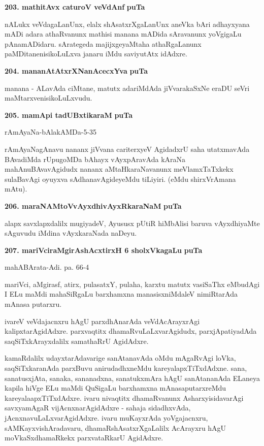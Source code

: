 \noindent
\textbf{203. mathitAvx caturoV veVdAnf} \hfill{\bf puTa \pageref{41}}

\smallskip
nALukx veVdagaLanUnx, elalx shAsatxrXgaLanUnx aneVka bAri adhayxyana mADi adara athaRvanunx mathisi\- manana mADida sAravanunx yoVgigaLu pAnamADidaru. sArategeda majijxgeyaMtaha athaR\-gaLanunx paMDi\-ta\-nenisikoLuLxva janaru iMdu saviyutAtx idAdxre.


\medskip
\noindent
\textbf{204. mananAtAtxrXNanAcecxYva} \hfill{\bf puTa \pageref{121}}

\smallskip
manana - ALavAda ciMtane, matutx adariMdAda jiVvarakaSxNe eraDU seVri maMtarxvenisikoLuLxvudu.

\medskip
\noindent
\textbf{205. mamApi tadUBxtikaraM} \hfill{\bf puTa \pageref{236}}

\hfill{rAmAyaNa-bAlakAMDa-5-35}

\smallskip
rAmAyaNagAnavu nananx jiVvana cariterxyeV AgidadxrU saha utatxmavAda BAvadiMda rUpu\-goMDa bAhayx vAyxpAravAda kAraNa mahAnuBAvavAgidudx nananx aMtaHkaraNavanunx meVlamxTaTxkekx sulaBavAgi oyuyx\-va sAdhanavAgideyeMdu tiLiyiri. (eMdu shirxVrAmana mAtu).

\medskip
\noindent
\textbf{206. maraNAMtoVvAyxdhivAyxRkaraNaM} \hfill{\bf puTa \pageref{41}}

\smallskip
alapx savxlapxdalilx mugiyadeV, Ayususx pUtiR hiMbAlisi baruva vAyxdhiyaMte sAguvudu iMdina vAyxkaraNada naDeyu.

\eject

\noindent
\textbf{207. mariVciraMgirAshAcxtirxH 6 sholxVkagaLu} \hfill{\bf puTa \pageref{88}}

\hfill{mahABArata-Adi. pa. 66-4}

\smallskip
mariVci, aMgirasf, atirx, pulasatxY, pulaha, karxtu matutx vasiSaThx eMbudAgi I ELu maMdi maha\-SiRgaLu barxhamxna manasisxniMdaleV nimiRtarAda mAnasa putarxru.

ivareV veVdajacnxru hAgU parxdhAnarAda veVdAcArayxrAgi kalipxtarAgidAdxre. parxvaqtitx dhamaRvuLaLxvarA\-gidudx, parxjApatiyadAda saqSiTxkArayxdalilx samathaRrU AgidAdxre. 

kamaRdalilx udayxtarAdavarige sanAtanavAda oMdu mAgaRvAgi loVka, saqSiTxkaranAda parxBuvu ani\-rudadhxneMdu kareyalapxTiTxdAdxne. sana, sanatusxjAta, sanaka, sananadxna, sanatukxmAra hAgU sanAtananAda ELaneya kapila hiVge ELu maMdi QuSigaLu barxhamxna mAnasaputarxreMdu kareyalaapxTiTxdAdxre. ivaru nivaq\-titx dhamaR\-vanunx AsharxyisidavarAgi savxyamAgaR vijAcnxnarAgidAdxre - sahaja sidadhxvAda, jAcnxnavuLaLxvarAgi\-dAdxre. ivaru muKayxrAda yoVgajacnxru, sAMKayxvishAradavaru, dhamaRshAsatxrXgaLalilx AcArayxru hAgU moVkaSxdhamaRkekx parxvataRkarU AgidAdxre.

